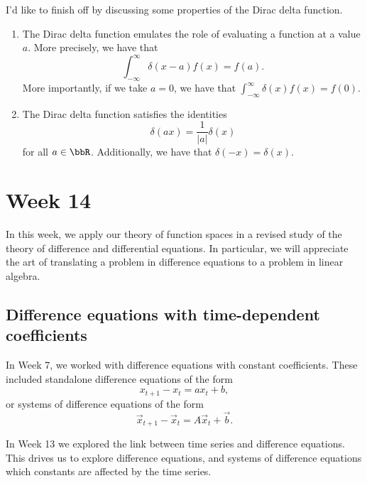 \documentclass[a4paper, 12pt,oneside,openany]{book}
\begin{document}
I'd like to finish off by discussing some properties of the Dirac delta function.

\begin{enumerate}
	\item The Dirac delta function emulates the role of evaluating a function at a value $a$. More precisely, we have that $$\int_{-\infty}^\infty \delta(x-a) f(x) = f(a).$$ More importantly, if we take $a=0$, we have that $\int_{-\infty}^\infty \delta(x) f(x) = f(0).$
	\item The Dirac delta function satisfies the identities $$\delta(ax) = \frac{1}{|a|} \delta(x)$$ for all $a\in \bbR$. Additionally, we have that $\delta(-x)=\delta(x)$.
\end{enumerate}



\chapter{Week 14}

In this week, we apply our theory of function spaces in a revised study of the theory of difference and differential equations. In particular, we will appreciate the art of translating a problem in difference equations to a problem in linear algebra. 

\section{Difference equations with time-dependent coefficients}

In Week 7, we worked with difference equations with constant coefficients. These included standalone difference equations of the form $$x_{t+1}-x_t = ax_t+b,$$ or systems of difference equations of the form $$\vec{x}_{t+1}-\vec{x}_t = A\vec{x}_t+\vec{b}.$$ 

In Week 13 we explored the link between time series and difference equations. This drives us to explore difference equations, and systems of difference equations which constants are affected by the time series. 
\end{document}
